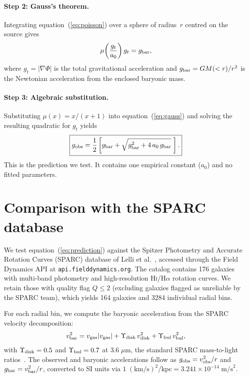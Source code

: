 \documentclass[twocolumn]{iopjournal}
\begin{document}
\paragraph{Step 2: Gauss's theorem.}
Integrating equation~(\ref{eq:poisson}) over a sphere of
radius~$r$ centred on the source gives
\begin{equation}
  \mu\!\left(\frac{g_t}{a_0}\right) g_t = g_{\rm bar},
  \label{eq:gauss}
\end{equation}
where $g_t = |\nabla\Phi|$ is the total gravitational
acceleration and $g_{\rm bar} = GM(<r)/r^2$ is the Newtonian
acceleration from the enclosed baryonic mass.

\paragraph{Step 3: Algebraic substitution.}
Substituting $\mu(x) = x/(x+1)$ into
equation~(\ref{eq:gauss}) and solving the resulting quadratic
for $g_t$ yields
\begin{equation}
  \boxed{g_{\rm obs}
  = \frac{1}{2}\left[g_{\rm bar}
    + \sqrt{g_{\rm bar}^2 + 4\,a_0\,g_{\rm bar}}
    \;\right].}
  \label{eq:prediction}
\end{equation}
This is the prediction we test.  It contains one empirical
constant ($a_0$) and no fitted parameters.


\section{Comparison with the SPARC database}

We test equation~(\ref{eq:prediction}) against the Spitzer
Photometry and Accurate Rotation Curves (SPARC) database of
Lelli et al.~\cite{Lelli2016}, accessed through the Field
Dynamics API at \texttt{api.fielddynamics.org}.  The catalog
contains 176 galaxies with multi-band photometry and
high-resolution \textsc{Hi}/H$\alpha$ rotation curves.  We
retain those with quality flag $Q \leq 2$ (excluding galaxies
flagged as unreliable by the SPARC team), which yields 164
galaxies and 3284 individual radial bins.

For each radial bin, we compute the baryonic acceleration from
the SPARC velocity decomposition:
\begin{equation}
  v_{\rm bar}^2 = v_{\rm gas}|v_{\rm gas}|
  + \Upsilon_{\rm disk}\,v_{\rm disk}^2
  + \Upsilon_{\rm bul}\,v_{\rm bul}^2,
\end{equation}
with $\Upsilon_{\rm disk} = 0.5$ and
$\Upsilon_{\rm bul} = 0.7$ at $3.6\;\mu$m, the standard SPARC
mass-to-light ratios~\cite{Lelli2016}.  The observed and
baryonic accelerations follow as $g_{\rm obs} = v_{\rm obs}^2/r$
and $g_{\rm bar} = v_{\rm bar}^2/r$, converted to SI units
via $1\;(\mathrm{km/s})^2/\mathrm{kpc} = 3.241 \times
10^{-14}\;\mathrm{m/s}^2$.
\end{document}
